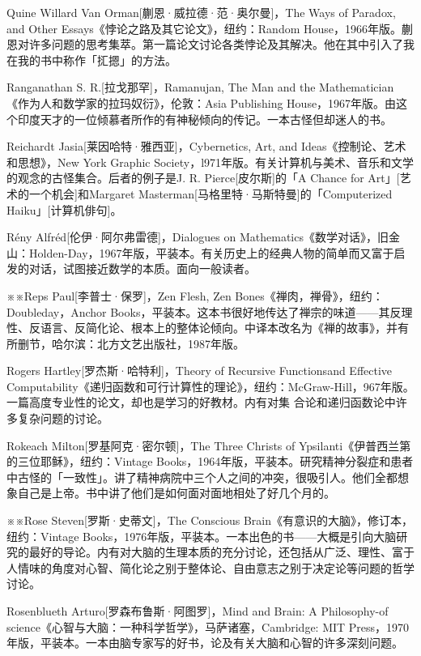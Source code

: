 \documentclass[
  12pt,
  twoside,
  openright,
  oldfontcommands,
]{memoir}
\begin{document}
Quine Willard Van Orman{[}蒯恩·威拉德·范·奥尔曼{]}，The Ways of Paradox,
and Other Essays《悖论之路及其它论文》，纽约：Random
House，1966年版。蒯恩对许多问题的思考集萃。第一篇论文讨论各类悖论及其解决。他在其中引入了我在我的书中称作「㧟摁」的方法。

Ranganathan S. R.{[}拉戈那罕{]}，Ramanujan, The Man and the
Mathematician《作为人和数学家的拉玛奴衍》，伦敦：Asia Publishing
House，1967年版。由这个印度天才的一位倾慕者所作的有神秘倾向的传记。一本古怪但却迷人的书。

Reichardt Jasia{[}莱因哈特·雅西亚{]}，Cybernetics, Art, and
Ideas《控制论、艺术和思想》，New York Graphic
Society，l971年版。有关计算机与美术、音乐和文学的观念的古怪集合。后者的例子是J.
R. Pierce{[}皮尔斯{]}的「A Chance for
Art」{[}艺术的一个机会{]}和Margaret
Masterman{[}马格里特·马斯特曼{]}的「Computerized
Haiku」{[}计算机俳句{]}。

Rény Alfréd{[}伦伊·阿尔弗雷德{]}，Dialogues on
Mathematics《数学对话》，旧金山：Holden-Day，1967年版，平装本。有关历史上的经典人物的简单而又富于启发的对话，试图接近数学的本质。面向一般读者。

※※Reps Paul{[}李普士·保罗{]}，Zen Flesh, Zen
Bones《禅肉，禅骨》，纽约：Doubleday，Anchor
Books，平装本。这本书很好地传达了禅宗的味道------其反理性、反语言、反简化论、根本上的整体论倾向。中译本改名为《禅的故事》，并有所删节，哈尔滨：北方文艺出版社，1987年版。

Rogers Hartley{[}罗杰斯·哈特利{]}，Theory of Recursive Functionsand
Effective
Computability《递归函数和可行计算性的理论》，纽约：McGraw-Hill，967年版。一篇高度专业性的论文，却也是学习的好教材。内有对集
合论和递归函数论中许多复杂问题的讨论。

Rokeach Milton{[}罗基阿克·密尔顿{]}，The Three Christs of
Ypsilanti《伊普西兰第的三位耶稣》，纽约：Vintage
Books，1964年版，平装本。研究精神分裂症和患者中古怪的「一致性」。讲了精神病院中三个人之间的冲突，很吸引人。他们全都想象自己是上帝。书中讲了他们是如何面对面地相处了好几个月的。

※※Rose Steven{[}罗斯·史蒂文{]}，The Conscious
Brain《有意识的大脑》，修订本，纽约：Vintage
Books，1976年版，平装本。一本出色的书------大概是引向大脑研究的最好的导论。内有对大脑的生理本质的充分讨论，还包括从广泛、理性、富于人情味的角度对心智、简化论之别于整体论、自由意志之别于决定论等问题的哲学讨论。

Rosenblueth Arturo{[}罗森布鲁斯·阿图罗{]}，Mind and Brain: A
Philosophy-of science《心智与大脑：一种科学哲学》，马萨诸塞，Cambridge:
MIT
Press，1970年版，平装本。一本由脑专家写的好书，论及有关大脑和心智的许多深刻问题。
\end{document}
